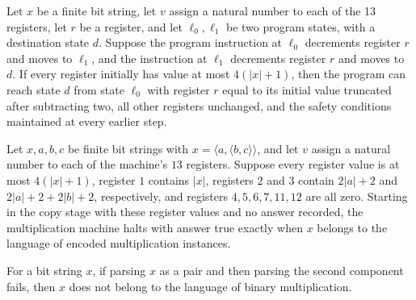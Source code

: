 \begin{lemma}
\label{Complexity.mult_sub_two}
\leanok
{}
Let $x$ be a finite bit string, let $v$ assign a natural number to each of the 13
registers, let $r$ be a register, and let $\ell_0,\ell_1$ be two program states, with a
destination state $d$. Suppose the program instruction at $\ell_0$ decrements register
$r$ and moves to $\ell_1$, and the instruction at $\ell_1$ decrements register $r$ and
moves to $d$. If every register initially has value at most $4(|x|+1)$, then the program
can reach state $d$ from state $\ell_0$ with register $r$ equal to its initial value
truncated after subtracting two, all other registers unchanged, and the safety
conditions maintained at every earlier step.
\end{lemma}

\begin{lemma}
\label{Complexity.mult_prepare_run}
\leanok
{}
Let $x,a,b,c$ be finite bit strings with $x=\langle a,\langle b,c\rangle\rangle$, and
let $v$ assign a natural number to each of the machine’s $13$ registers. Suppose every
register value is at most $4(|x|+1)$, register $1$ contains $|x|$, registers $2$ and $3$
contain $2|a|+2$ and $2|a|+2+2|b|+2$, respectively, and registers $4,5,6,7,11,12$ are
all zero. Starting in the copy stage with these register values and no answer recorded,
the multiplication machine halts with answer true exactly when $x$ belongs to the
language of encoded multiplication instances.
\end{lemma}

\begin{lemma}
\label{Complexity.mult_bad_decode}
\leanok
{}
For a bit string $x$, if parsing $x$ as a pair and then parsing the second component
fails, then $x$ does not belong to the language of binary multiplication.
\end{lemma}

